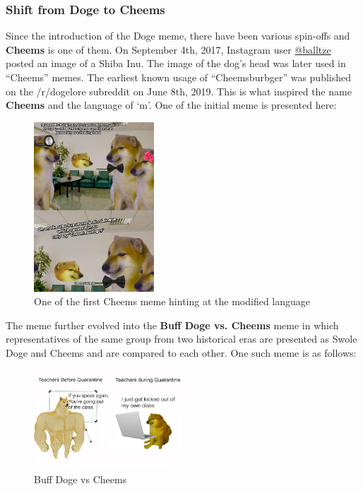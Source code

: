 \documentclass{article}
\begin{document}
\subsubsection{Shift from Doge to Cheems}
Since the introduction of the Doge meme, there have been various spin-offs and \textbf{Cheems} is one of them. On September 4th, 2017, Instagram user \href{https://www.instagram.com/balltze}{@balltze} posted an image of a Shiba Inu. The image of the dog's head was later used in ``Cheems'' memes. The earliest known usage of ``Cheemsburbger'' was published on the /r/dogelore subreddit on June 8th, 2019. This is what inspired the name \textbf{Cheems} and the language of `m'. One of the initial meme is presented here:
\begin{figure}[H]
    \centering
    \includegraphics[width=0.4\textwidth]{figures/cheems_1.jpg}
    \caption{One of the first Cheems meme hinting at the modified language}
\end{figure}

The meme further evolved into the \textbf{Buff Doge vs. Cheems} meme in which representatives of the same group from two historical eras are presented as Swole Doge and Cheems and are compared to each other. One such meme is as follows:
\begin{figure}[H]
    \centering
    \includegraphics[width=0.5\textwidth]{figures/cheems_2.jpg}
    \caption{Buff Doge vs Cheems}
\end{figure}
\end{document}
